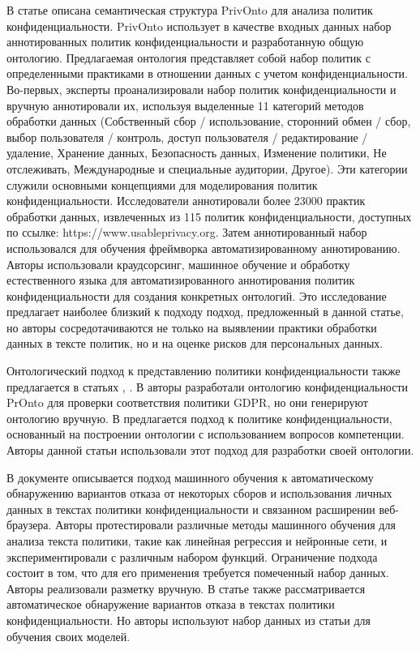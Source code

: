 \documentclass[../main]{subfiles}
\begin{document}
В статье \cite{MDPI6} описана семантическая структура PrivOnto для анализа политик конфиденциальности. PrivOnto использует в качестве входных данных набор аннотированных политик конфиденциальности и разработанную общую онтологию. Предлагаемая онтология представляет собой набор политик с определенными практиками в отношении данных с учетом конфиденциальности. Во-первых, эксперты проанализировали набор политик конфиденциальности и вручную аннотировали их, используя выделенные 11 категорий методов обработки данных (Собственный сбор / использование, сторонний обмен / сбор, выбор пользователя / контроль, доступ пользователя / редактирование / удаление, Хранение данных, Безопасность данных, Изменение политики, Не отслеживать, Международные и специальные аудитории, Другое). Эти категории служили основными концепциями для моделирования политик конфиденциальности. Исследователи аннотировали более 23000 практик обработки данных, извлеченных из 115 политик конфиденциальности, доступных по ссылке: https://www.usableprivacy.org. Затем аннотированный набор использовался для обучения фреймворка автоматизированному аннотированию. Авторы использовали краудсорсинг, машинное обучение и обработку естественного языка для автоматизированного аннотирования политик конфиденциальности для создания конкретных онтологий. Это исследование предлагает наиболее близкий к подходу подход, предложенный в данной статье, но авторы сосредотачиваются не только на выявлении практики обработки данных в тексте политик, но и на оценке рисков для персональных данных.

Онтологический подход к представлению политики конфиденциальности также предлагается в статьях \cite{MDPI7}, \cite{MDPI8}. В \cite{MDPI7} авторы разработали онтологию конфиденциальности PrOnto для проверки соответствия политики GDPR, но они генерируют онтологию вручную. В \cite{MDPI8} предлагается подход к политике конфиденциальности, основанный на построении онтологии с использованием вопросов компетенции. Авторы данной статьи использовали этот подход для разработки своей онтологии.

В документе \cite{MDPI9} описывается подход машинного обучения к автоматическому обнаружению вариантов отказа от некоторых сборов и использования личных данных в текстах политики конфиденциальности и связанном расширении веб-браузера. Авторы \cite{MDPI9} протестировали различные методы машинного обучения для анализа текста политики, такие как линейная регрессия и нейронные сети, и экспериментировали с различным набором функций. Ограничение подхода состоит в том, что для его применения требуется помеченный набор данных. Авторы реализовали разметку вручную. В статье \cite{MDPI10} также рассматривается автоматическое обнаружение вариантов отказа в текстах политики конфиденциальности. Но авторы используют набор данных из статьи \cite{MDPI6} для обучения своих моделей.
\end{document}
